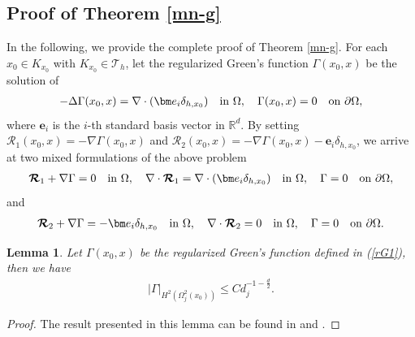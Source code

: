 \documentclass[1996/10/24]{amsart}
\newtheorem{lemma}[theorem]{Lemma}
\theoremstyle{definition}
\numberwithin{equation}{section}
\begin{document}
\subsection{Proof of Theorem \ref{mn-g}}\label{sec3:4}

In the following, we provide the complete proof of Theorem \ref{mn-g}.
For each $x_0\in K_{x_0}$ with $K_{x_0}\in\mathcal{T}_h$, let the regularized Green's function $\Gamma(x_0,x)$
be the solution of
\begin{align}
-\Delta\Gamma(x_0,x)=\nabla\cdot({\bm e}_i\delta_{h,x_0})\quad {\rm in}~\Omega,\quad \Gamma(x_0,x)=0\quad {\rm on}~\partial\Omega,\label{rG1}
\end{align}
where ${\bm e}_i$ is the $i$-th standard basis vector in $\mathbb{R}^d$. By setting $\boldsymbol{\mathcal{R}}_1(x_0,x)=-\nabla\Gamma(x_0,x)$ and $\boldsymbol{\mathcal{ R}}_2
(x_0,x)=-\nabla\Gamma(x_0,x)-{\bm e}_i\delta_{h,x_0}$, we arrive at two mixed formulations of the above problem
\begin{align}
\boldsymbol{\mathcal{R}}_1+\nabla\Gamma=0\quad {\rm in}~\Omega,\quad
\nabla\cdot\boldsymbol{\mathcal{R}}_1=\nabla\cdot({\bm e}_i\delta_{h,x_0})\quad {\rm in}~\Omega,\quad
\Gamma=0\quad {\rm on}~\partial\Omega,\label{rG1-1}
\end{align}
and
\begin{align}
\boldsymbol{\mathcal{R}}_2+\nabla\Gamma=-{\bm e}_i\delta_{h,x_0}\quad {\rm in}~\Omega,\quad
\nabla\cdot\boldsymbol{\mathcal{R}}_2=0\quad {\rm in}~\Omega,\quad
\Gamma=0\quad {\rm on}~\partial\Omega.\label{rG1-2}
\end{align}

\begin{lemma}\label{rG1-lee}
Let $\Gamma(x_0,x)$ be the regularized Green's function defined in (\ref{rG1}), then we have
\begin{align}
|\Gamma|_{H^2(\Omega_j^2(x_0))}\leq C d_j^{-1-\frac{d}{2}}.
\end{align}
\end{lemma}
\begin{proof}
The result presented in this lemma can be found in \cite[Lemma 3.7]{lc2026} and \cite[(4.10)]{dlsw2012}.
\end{proof}
\end{document}
